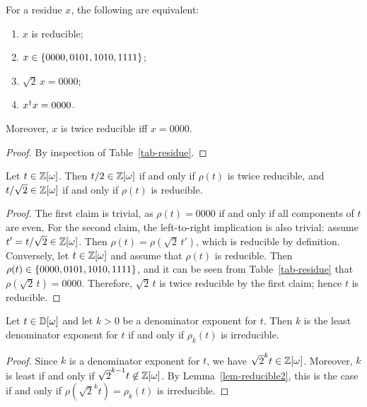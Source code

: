 \begin{lemma}\label{lem-reducible}
  For a residue $x$, the following are equivalent:
  \begin{enumerate}\alphalabels
    \item $x$ is reducible;
    \item $x\in\{0000,0101,1010,1111\}$;
    \item $\sqrt{2}\,x = 0000$;
    \item $x^{\dagger} x=0000$.
  \end{enumerate}
  Moreover, $x$ is twice reducible iff $x=0000$.
\end{lemma}

\begin{proof}
  By inspection of Table~\vref{tab-residue}.
\end{proof}

\begin{lemma}\label{lem-reducible2}
  Let $t\in\mathbb{Z}[\omega]$. Then $t/2\in\mathbb{Z}[\omega]$ if and only if $\rho(t)$ is twice reducible, and
  $t/\sqrt{2}\in\mathbb{Z}[\omega]$ if and only if $\rho(t)$ is reducible.
\end{lemma}

\begin{proof}
  The first claim is trivial, as $\rho(t)=0000$ if and only if all components of $t$ are even. For
  the second claim, the left-to-right implication is also trivial: assume $t'=t/\sqrt{2}\in\mathbb{Z}[\omega]$.
  Then $\rho(t) = \rho(\sqrt{2}\,t')$, which is reducible by definition. Conversely, let $t\in\mathbb{Z}[\omega]$
  and assume that $\rho(t)$ is reducible. Then $\rho(t)\in\{0000, 0101, 1010, 1111\}$, and it can
  be seen from Table~\vref{tab-residue} that $\rho(\sqrt{2}\,t)=0000$. Therefore, $\sqrt{2}\,t$ is
  twice reducible by the first claim; hence $t$ is reducible.
\end{proof}

\begin{corollary}\label{cor-reducible3}
  Let $t\in\mathbb{D}[\omega]$ and let $k>0$ be a denominator exponent for $t$. Then $k$ is the least denominator
  exponent for $t$ if and only if $\rho_k(t)$ is irreducible.
\end{corollary}

\begin{proof}
  Since $k$ is a denominator exponent for $t$, we have $\sqrt{2}^k t \in \mathbb{Z}[\omega]$. Moreover, $k$ is
  least if and only if $\sqrt{2}^{k-1} t\not\in\mathbb{Z}[\omega]$. By Lemma~\vref{lem-reducible2}, this is the
  case if and only if $\rho(\sqrt{2}^k t)=\rho_k(t)$ is irreducible.
\end{proof}

